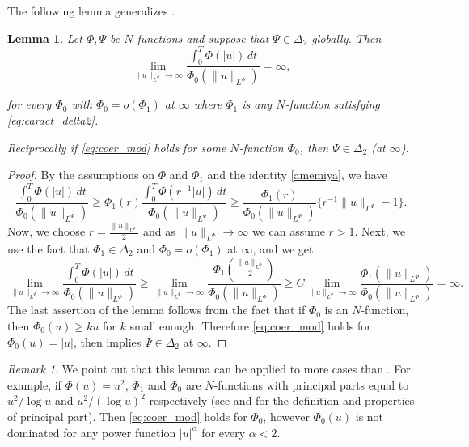 \documentclass[twoside]{article}
\newtheorem{lem}[thm]{Lemma}
\theoremstyle{remark}
\newtheorem{comentario}{Remark}
\newcommand{\orlnor}{\|_{L^{\Phi}}}
\renewcommand{\geq}{\geqslant}
\begin{document}
The following lemma generalizes \cite[Lemma 5.2]{ABGMS2015}.

\begin{lem}\label{lem_coer}
Let $\Phi,\Psi$ be $N$-functions and suppose that $\Psi \in \Delta_2$ globally. Then
\begin{equation}\label{eq:coer_mod}
\lim\limits_{\|u\orlnor\to \infty}
\frac{\int_0^T \Phi(|u|)\,dt}{\Phi_0(\|u\orlnor)}=\infty,
\end{equation}


for every $\Phi_0$ with $\Phi_0=o(\Phi_1)$ at $\infty$ where $\Phi_1$ is any $N$-function satisfying \eqref{eq:caract_delta2}.

Reciprocally if  \eqref{eq:coer_mod} holds for some $N$-function $\Phi_0$,  then $\Psi\in\Delta_2$ (at $\infty$). 
\end{lem}

\begin{proof}
By the assumptions on $\Phi$ and $\Phi_1$  and the identity \eqref{amemiya}, we have
\[
\frac{\int_0^T \Phi(|u|)\,dt}{\Phi_0(\|u\orlnor)}\geq
\Phi_1(r) \frac{\int_0^T \Phi(r^{-1}|u|)\,dt}{\Phi_0(\|u\orlnor)}\geq
\frac{\Phi_1(r)}{\Phi_0(\|u\orlnor)}\{r^{-1}\|u\orlnor-1\}.
\]
Now, we choose $r=\frac{\|u\orlnor}{2}$ and as $\|u\orlnor\to\infty$ we can assume $r>1$.
Next, we use the fact that $\Phi_1\in\Delta_2$ and
$\Phi_0=o(\Phi_1)$ at $\infty$, and  we get
\[
\lim\limits_{\|u\orlnor \to \infty} \frac{\int_0^T \Phi(|u|)\,dt}{\Phi_0(\|u\orlnor)}\geq
\lim\limits_{\|u\orlnor \to \infty} \frac{\Phi_1\left(\frac{\|u\orlnor}{2}\right)}{\Phi_0(\|u\orlnor)}
\geq
C \lim\limits_{\|u\orlnor \to \infty} \frac{\Phi_1(\|u\orlnor)}{\Phi_0(\|u\orlnor)}=\infty.
\]
The last assertion of the lemma follows from the fact that if $\Phi_0$ is an $N$-function, then $\Phi_0(u)\geq ku$ for  $k$ small enough. Therefore \eqref{eq:coer_mod} holds for $\Phi_0(u)=|u|$, then \cite[Lemma 5.2]{ABGMS2015}  implies  $\Psi\in\Delta_2$ at $\infty$.
\end{proof}


\begin{comentario}  We point out that this lemma can be applied to more cases than \cite[Lemma 5.2]{ABGMS2015}. For example, if $\Phi(u)=u^2$, $\Phi_1$ and $\Phi_0$ are  $N$-functions with principal parts equal to $u^2/\log u$ and $u^2/(\log u)^2$ respectively (see \cite[p. 16]{KR} and \cite[Section 7]{KR} for the definition and properties of principal part). Then  \eqref{eq:coer_mod} holds for $\Phi_0$, however $\Phi_0(u)$ is not dominated for any  power function $|u|^{\alpha}$ for every $\alpha<2$. 
\end{comentario}
\end{document}

